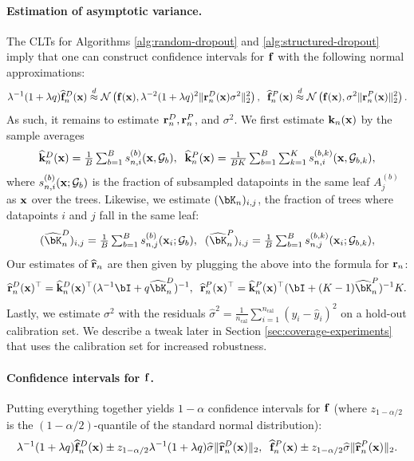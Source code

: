 \paragraph{Estimation of asymptotic variance.} The CLTs for Algorithms \ref{alg:random-dropout} and \ref{alg:structured-dropout} imply that one can construct confidence intervals for $\mathbf{f}$ with the following normal approximations:
$$\lambda^{-1}(1+\lambda q)\widehat{\mathbf{f}}_n^D(\mathbf{x}) \stackrel{d}{\approx} {\mathcal{N}}\left(\mathbf{f}(\mathbf{x}), \lambda^{-2}(1+\lambda q)^2\lVert\mathbf{r}_n^D(\mathbf{x})\sigma^2 \rVert_2^2 \right), \;\; \widehat{\mathbf{f}}_n^P(\mathbf{x}) \stackrel{d}{\approx} {\mathcal{N}}\left(\mathbf{f}(\mathbf{x}), \sigma^2 \lVert\mathbf{r}_n^P(\mathbf{x})\rVert_2^2\right).$$
As such, it remains to estimate $\mathbf{r}_n^D, \mathbf{r}_n^P$, and $\sigma^2$. We first estimate $\mathbf{k}_n(\mathbf{x})$ by the sample averages
\begin{equation}
    \textstyle{\widehat{\mathbf{k}}_n^D(\mathbf{x}) = \frac{1}{B} \sum_{b=1}^B s_{n,i}^{(b)}(\mathbf{x}, {\mathcal{G}}_b),\;\; \widehat{\mathbf{k}}_n^P(\mathbf{x}) = \frac{1}{BK} \sum_{b=1}^B \sum_{k=1}^K s_{n,i}^{(b,k)}(\mathbf{x}, {\mathcal{G}}_{b,k}),}
    \label{eqn:hat-k}
\end{equation}
where $s_{n,i}^{(b)}(\mathbf{x}; {\mathcal{G}}_b)$ is the fraction of subsampled datapoints in the same leaf $A_j^{(b)}$ as $\mathbf{x}$ over the trees. Likewise, we estimate $(\bK_n)_{i,j}$, the fraction of trees where datapoints $i$ and $j$ fall in the same leaf:
\begin{equation}
    \textstyle{(\widehat{\bK}_n^D)_{i,j} = \frac{1}{B} \sum_{b=1}^B s_{n,j}^{(b)}(\bx_i; \gG_b), \;\;(\widehat{\bK}_n^P)_{i,j} = \frac{1}{B} \sum_{b=1}^B s_{n,j}^{(b,k)}(\bx_i; \gG_{b,k})},
    \label{hat-K}
\end{equation}
Our estimates of $\widehat{\mathbf{r}}_n$ are then given by plugging the above into the formula for $\mathbf{r}_n$:
$$\widehat{\br}_n^D(\bx)^\top = \widehat{\bk}^D_n(\bx)^\top (\lambda^{-1}\bI + q\widehat{\bK}^D_n)^{-1}, \;\;\widehat{\br}_n^P(\bx)^\top = \widehat{\bk}^P_n(\bx)^\top (\bI + (K-1)\widehat{\bK}^P_n)^{-1}K.$$
Lastly, we estimate $\sigma^2$ with the residuals $\widehat{\sigma}^2 = \frac{1}{n_{\text{cal}}}\sum_{i=1}^{n_{\text{cal}}} (y_i - \widehat{y}_i)^2$ on a hold-out calibration set. We describe a tweak later in Section \ref{sec:coverage-experiments} that uses the calibration set for increased robustness.

\vspace{-1ex}
\paragraph{Confidence intervals for $\mathbf{f}$.} Putting everything together yields $1-\alpha$ confidence intervals for $\mathbf{f}$ (where $z_{1-\alpha/2}$ is the $(1-\alpha/2)$-quantile of the standard normal distribution):
\begin{equation}
    \lambda^{-1}(1+\lambda q)\widehat{\mathbf{f}}_n^D(\mathbf{x}) \pm z_{1-\alpha/2}\lambda^{-1}(1+\lambda q)\widehat{\sigma}\lVert\widehat{\mathbf{r}}_n^D(\mathbf{x})\rVert_2 ,\;\; \widehat{\mathbf{f}}_n^P(\mathbf{x}) \pm z_{1-\alpha/2} \widehat{\sigma}\lVert\widehat{\mathbf{r}}_n^P(\mathbf{x})\rVert_2.
    \label{eqn:confidence-intervals}
\end{equation}


